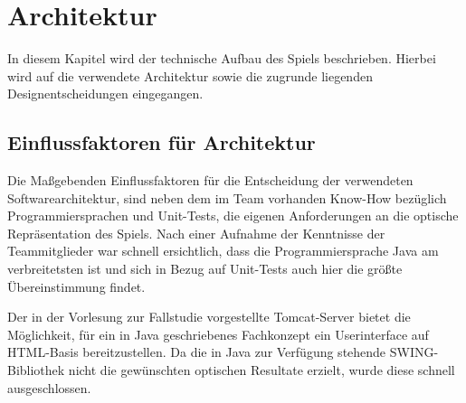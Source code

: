 \clearpage
\chapter{Architektur}
In diesem Kapitel wird der technische Aufbau des Spiels beschrieben. Hierbei wird auf die verwendete Architektur sowie die zugrunde liegenden Designentscheidungen eingegangen.

\section{Einflussfaktoren für Architektur}
Die Maßgebenden Einflussfaktoren für die Entscheidung der verwendeten Softwarearchitektur, sind neben dem im Team vorhanden Know-How bezüglich Programmiersprachen und Unit-Tests, die eigenen Anforderungen an die optische Repräsentation des Spiels. Nach einer Aufnahme der Kenntnisse der Teammitglieder war schnell ersichtlich, dass die Programmiersprache Java am verbreitetsten ist und sich in Bezug auf Unit-Tests auch hier die größte Übereinstimmung findet.

Der in der Vorlesung zur Fallstudie vorgestellte Tomcat-Server bietet die Möglichkeit, für ein in Java geschriebenes Fachkonzept ein Userinterface auf HTML-Basis bereitzustellen. Da die in Java zur Verfügung stehende SWING-Bibliothek nicht die gewünschten optischen Resultate erzielt, wurde diese schnell ausgeschlossen.

